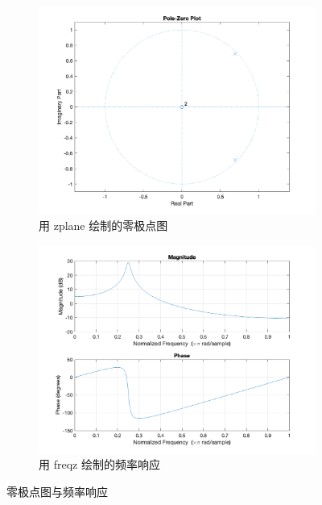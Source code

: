 \documentclass[a4paper]{article}  %
\begin{document}
\begin{figure}[ht]
    \centering
    \begin{subfigure}[b]{0.48\textwidth}
        \centering
        \includegraphics[width=\textwidth]{asserts/1_1_zplane.png}
        \caption{
            用 zplane 绘制的零极点图
        }\label{fig:1_1_zplane}
    \end{subfigure}
    \hfill
    \begin{subfigure}[b]{0.48\textwidth}
        \centering
        \includegraphics[width=\textwidth]{asserts/1_1_freqz.png}
        \caption{
            用 freqz 绘制的频率响应
        }\label{fig:1_1_freqz}
    \end{subfigure}
    \caption{
        零极点图与频率响应
    }
\end{figure}
\end{document}
